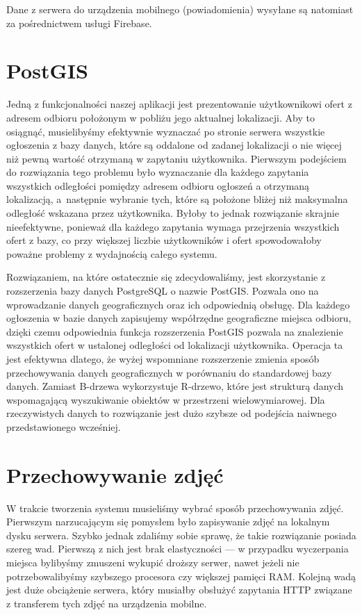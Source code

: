 \documentclass[licencjacka]{pracamgr}
\begin{document}
Dane z serwera do urządzenia mobilnego (powiadomienia) wysyłane są natomiast za pośrednictwem usługi Firebase.

\section{PostGIS}
Jedną z funkcjonalności naszej aplikacji jest prezentowanie użytkownikowi ofert z adresem odbioru położonym w pobliżu jego aktualnej lokalizacji. Aby to osiągnąć, musielibyśmy efektywnie wyznaczać po stronie serwera wszystkie ogłoszenia z bazy danych, które są oddalone od zadanej lokalizacji o nie więcej niż pewną wartość otrzymaną w zapytaniu użytkownika. Pierwszym podejściem do rozwiązania tego problemu było wyznaczanie dla każdego zapytania wszystkich odległości pomiędzy adresem odbioru ogłoszeń a otrzymaną lokalizacją, a~następnie wybranie tych, które są położone bliżej niż maksymalna odległość wskazana przez użytkownika. Byłoby to jednak rozwiązanie skrajnie nieefektywne, ponieważ dla każdego zapytania wymaga przejrzenia wszystkich ofert z bazy, co przy większej liczbie użytkowników i ofert spowodowałoby poważne problemy z wydajnością całego systemu.

Rozwiązaniem, na które ostatecznie się zdecydowaliśmy, jest skorzystanie z rozszerzenia bazy danych PostgreSQL o nazwie PostGIS\@. Pozwala ono na wprowadzanie danych geograficznych oraz ich odpowiednią obsługę. Dla każdego ogłoszenia w bazie danych zapisujemy współrzędne geograficzne miejsca odbioru, dzięki czemu odpowiednia funkcja rozszerzenia PostGIS pozwala na znalezienie wszystkich ofert w ustalonej odległości od lokalizacji użytkownika. Operacja ta jest efektywna dlatego, że wyżej wspomniane rozszerzenie zmienia sposób przechowywania danych geograficznych w porównaniu do standardowej bazy danych. Zamiast B-drzewa wykorzystuje R-drzewo, które jest strukturą danych wspomagającą wyszukiwanie obiektów w przestrzeni wielowymiarowej. Dla rzeczywistych danych to rozwiązanie jest dużo szybsze od podejścia naiwnego przedstawionego wcześniej.

\section{Przechowywanie zdjęć}

W trakcie tworzenia systemu musieliśmy wybrać sposób przechowywania zdjęć. Pierwszym narzucającym się pomysłem było zapisywanie zdjęć na lokalnym dysku serwera. Szybko jednak zdaliśmy sobie sprawę, że takie rozwiązanie posiada szereg wad.
Pierwszą z nich jest brak elastyczności --- w przypadku wyczerpania miejsca bylibyśmy zmuszeni wykupić droższy serwer, nawet jeżeli nie potrzebowalibyśmy szybszego procesora czy większej pamięci RAM. Kolejną wadą jest duże obciążenie serwera, który musiałby obsłużyć zapytania HTTP związane z transferem tych zdjęć na urządzenia mobilne.
\end{document}
